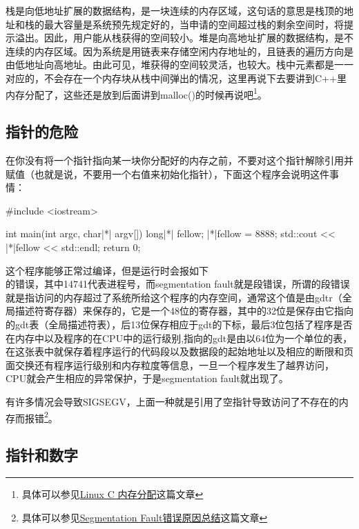 栈是向低地址扩展的数据结构，是一块连续的内存区域，这句话的意思是栈顶的地址和栈的最大容量是系统预先规定好的，当申请的空间超过栈的剩余空间时，将提示溢出。因此，用户能从栈获得的空间较小。堆是向高地址扩展的数据结构，是不连续的内存区域。因为系统是用链表来存储空闲内存地址的，且链表的遍历方向是由低地址向高地址。由此可见，堆获得的空间较灵活，也较大。栈中元素都是一一对应的，不会存在一个内存块从栈中间弹出的情况，这里再说下去要讲到C++里内存分配了，这些还是放到后面讲到malloc()的时候再说吧\footnote{具体可以参见\thinspace\href{https://www.cnblogs.com/zhaoosheLBJ/p/9281253.html}{Linux C 内存分配}这篇文章}。

\subsection{指针的危险}

在你没有将一个指针指向某一块你分配好的内存之前，不要对这个指针解除引用并赋值（也就是说，不要用一个右值来初始化指针），下面这个程序会说明这件事情：

\begin{cpp}
#include <iostream>

int main(int argc, char|*| argv[]) {
    long|*| fellow;
    |*|fellow = 8888;
    std::cout << |*|fellow << std::endl;
    return 0;
}
\end{cpp}

这个程序能够正常过编译，但是运行时会报如下\\ 的错误，其中14741代表进程号，而segmentation fault就是段错误，所谓的段错误就是指访问的内存超过了系统所给这个程序的内存空间，通常这个值是由gdtr（全局描述符寄存器）来保存的，它是一个48位的寄存器，其中的32位是保存由它指向的gdt表（全局描述符表），后13位保存相应于gdt的下标，最后3位包括了程序是否在内存中以及程序的在CPU中的运行级别,指向的gdt是由以64位为一个单位的表，在这张表中就保存着程序运行的代码段以及数据段的起始地址以及相应的断限和页面交换还有程序运行级别和内存粒度等信息，一旦一个程序发生了越界访问，CPU就会产生相应的异常保护，于是segmentation fault就出现了。

有许多情况会导致SIGSEGV，上面一种就是引用了空指针导致访问了不存在的内存而报错\footnote{具体可以参见\thinspace\href{https://www.cnblogs.com/qiumingcheng/p/11254648.html}{Segmentation Fault错误原因总结}这篇文章}。

\subsection{指针和数字}

